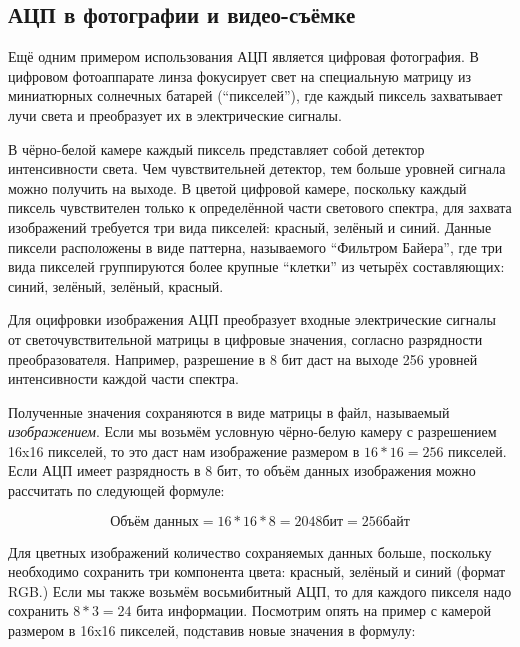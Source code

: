 \documentclass[../sparc.tex]{subfiles}
\begin{document}
\subsection{АЦП в фотографии и видео-съёмке}

Ещё одним примером использования \gls{АЦП} является цифровая фотография.  В
цифровом фотоаппарате линза фокусирует свет на специальную матрицу из
миниатюрных солнечных батарей (``пикселей''), где каждый пиксель захватывает
лучи света и преобразует их в электрические сигналы. \cite{expertphotography}

В чёрно-белой камере каждый пиксель представляет собой детектор интенсивности
света.  Чем чувствительней детектор, тем больше уровней сигнала можно получить
на выходе.  В цветой цифровой камере, поскольку каждый пиксель чувствителен
только к определённой части светового спектра, для захвата изображений требуется
три вида пикселей: красный, зелёный и синий.  Данные пиксели расположены в виде
паттерна, называемого ``Фильтром Байера'', где три вида пикселей группируются
более крупные ``клетки'' из четырёх составляющих: синий, зелёный, зелёный,
красный.

Для оцифровки изображения АЦП преобразует входные электрические сигналы от
светочувствительной матрицы в цифровые значения, согласно разрядности
преобразователя.  Например, разрешение в 8 бит даст на выходе 256 уровней
интенсивности каждой части спектра.

Полученные значения сохраняются в виде матрицы в файл, называемый
\emph{изображением}.  Если мы возьмём условную чёрно-белую камеру с разрешением
16x16 пикселей, то это даст нам изображение размером в $16 * 16 = 256$ пикселей.
Если АЦП имеет разрядность в 8 бит, то объём данных изображения можно рассчитать
по следующей формуле:

\begin{equation}
  \mbox{Объём данных} = 16 * 16 * 8 = 2048 \mbox{бит} = 256 \mbox{байт}
  \label{equation:adc-image-0}
\end{equation}

Для цветных изображений количество сохраняемых данных больше, поскольку
необходимо сохранить три компонента цвета: красный, зелёный и синий (формат
RGB.)  Если мы также возьмём восьмибитный АЦП, то для каждого пикселя надо
сохранить $8 * 3 = 24$ бита информации.  Посмотрим опять на пример с камерой
размером в 16x16 пикселей, подставив новые значения в формулу:
\end{document}
